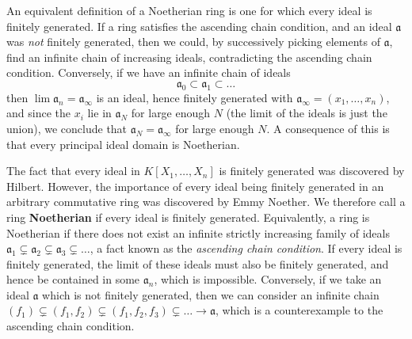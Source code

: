 An equivalent definition of a Noetherian ring is one for which every ideal is finitely generated. If a ring satisfies the ascending chain condition, and an ideal $\mathfrak{a}$ was {\it not} finitely generated, then we could, by successively picking elements of $\mathfrak{a}$, find an infinite chain of increasing ideals, contradicting the ascending chain condition. Conversely, if we have an infinite chain of ideals
%
\[ \mathfrak{a}_0 \subset \mathfrak{a}_1 \subset \dots \]
%
then $\lim \mathfrak{a}_n = \mathfrak{a}_\infty$ is an ideal, hence finitely generated with $\mathfrak{a}_\infty = (x_1, \dots, x_n)$, and since the $x_i$ lie in $\mathfrak{a}_N$ for large enough $N$ (the limit of the ideals is just the union), we conclude that $\mathfrak{a}_N = \mathfrak{a}_\infty$ for large enough $N$. A consequence of this is that every principal ideal domain is Noetherian.

The fact that every ideal in $K[X_1, \dots, X_n]$ is finitely generated was discovered by Hilbert. However, the importance of every ideal being finitely generated in an arbitrary commutative ring was discovered by Emmy Noether. We therefore call a ring {\bf Noetherian} if every ideal is finitely generated. Equivalently, a ring is Noetherian if there does not exist an infinite strictly increasing family of ideals $\mathfrak{a}_1 \subsetneq \mathfrak{a}_2 \subsetneq \mathfrak{a}_3 \subsetneq \dots$, a fact known as the {\it ascending chain condition}. If every ideal is finitely generated, the limit of these ideals must also be finitely generated, and hence be contained in some $\mathfrak{a}_n$, which is impossible. Conversely, if we take an ideal $\mathfrak{a}$ which is not finitely generated, then we can consider an infinite chain $(f_1) \subsetneq (f_1,f_2) \subsetneq (f_1,f_2,f_3) \subsetneq \dots \to \mathfrak{a}$, which is a counterexample to the ascending chain condition.

